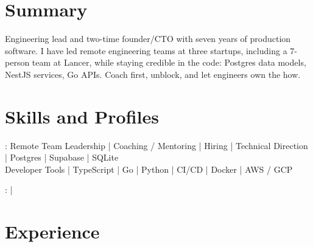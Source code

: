 \documentclass[print]{jack-resume}
\begin{document}
\pagecolor{darkmodeBackground}


\begin{minipage}[t][1cm][t]{.03\textwidth}
    \hfill
\end{minipage}

\section{Summary}
Engineering lead and two-time founder/CTO with seven years of production software. I have led remote engineering teams at three startups, including a 7-person team at Lancer, while staying credible in the code: Postgres data models, NestJS services, Go APIs. Coach first, unblock, and let engineers own the how.
\sectionsep

\section{Skills and Profiles}
:
Remote Team Leadership \hfill | \hfill
Coaching / Mentoring \hfill | \hfill
Hiring \hfill | \hfill
Technical Direction \hfill | \hfill
Postgres \hfill | \hfill
Supabase \hfill | \hfill
SQLite \\
\hspace{1.0cm} Developer Tools \hfill | \hfill
TypeScript \hfill | \hfill
Go \hfill | \hfill
Python \hfill | \hfill
CI/CD \hfill | \hfill
Docker \hfill | \hfill
AWS / GCP \\

\raggedright{
    :
      \href{https://www.linkedin.com/in/jack-sturtevant/}{ \ExternalLink} |
     \href{https://github.com/jacksturt}{ \ExternalLink}}

\section{Experience}
\end{document}
